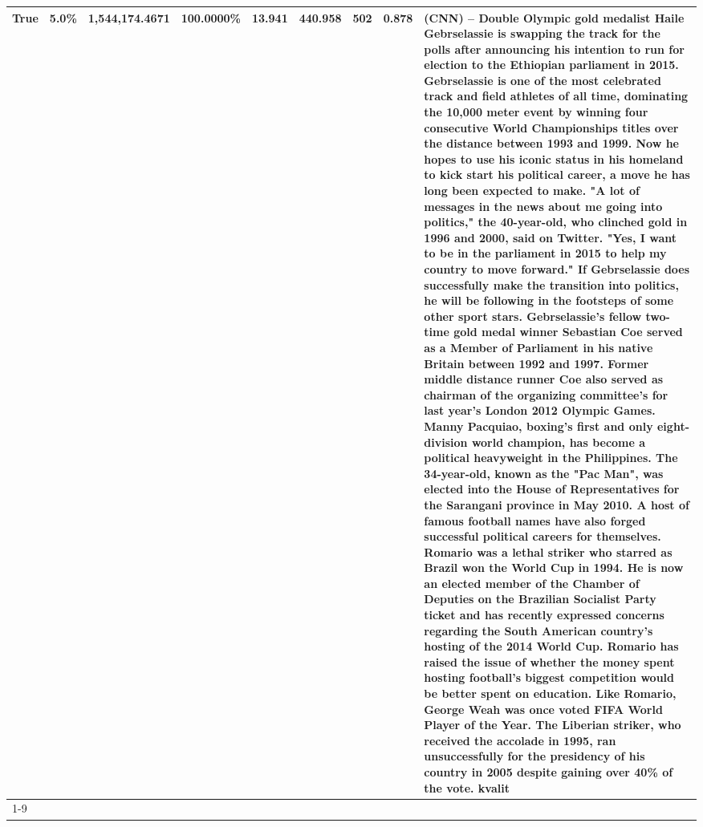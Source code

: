 \begin{table}[H]
{\begin{tabular}{lllrlllll}
True & 5.0\% & 1,544,174.4671 & \bfseries \color{red} 100.0000\% & 13.941 & 440.958 & 502 & 0.878 & (CNN) -- Double Olympic gold medalist Haile Gebrselassie is swapping the track for the polls after announcing his intention to run for election to the Ethiopian parliament in 2015. Gebrselassie is one of the most celebrated track and field athletes of all time, dominating the 10,000 meter event by winning four consecutive World Championships titles over the distance between 1993 and 1999. Now he hopes to use his iconic status in his homeland to kick start his political career, a move he has long been expected to make. "A lot of messages in the news about me going into politics," the 40-year-old, who clinched gold in 1996 and 2000, said on Twitter. "Yes, I want to be in the parliament in 2015 to help my country to move forward." If Gebrselassie does successfully make the transition into politics, he will be following in the footsteps of some other sport stars. Gebrselassie's fellow two-time gold medal winner Sebastian Coe served as a Member of Parliament in his native Britain between 1992 and 1997. Former middle distance runner Coe also served as chairman of the organizing committee's for last year's London 2012 Olympic Games. Manny Pacquiao, boxing's first and only eight-division world champion, has become a political heavyweight in the Philippines. The 34-year-old, known as the "Pac Man", was elected into the House of Representatives for the Sarangani province in May 2010. A host of famous football names have also forged successful political careers for themselves. Romario was a lethal striker who starred as Brazil won the World Cup in 1994. He is now an elected member of the Chamber of Deputies on the Brazilian Socialist Party ticket and has recently expressed concerns regarding the South American country's hosting of the 2014 World Cup. Romario has raised the issue of whether the money spent hosting football's biggest competition would be better spent on education. Like Romario, George Weah was once voted FIFA World Player of the Year. The Liberian striker, who received the accolade in 1995, ran unsuccessfully for the presidency of his country in 2005 despite gaining over 40\% of the vote. kvalit \\
\cline{1-9}

\end{tabular}}
\end{table}
